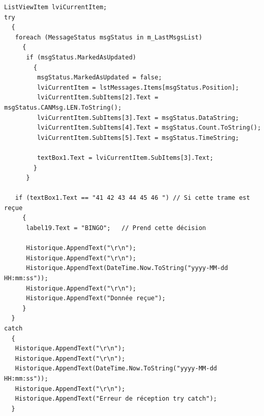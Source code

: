 \documentclass[10pt,a4paper,final]{article}
\begin{document}
\begin{lstlisting}
ListViewItem lviCurrentItem;
try
  {
   foreach (MessageStatus msgStatus in m_LastMsgsList)
     {
      if (msgStatus.MarkedAsUpdated)
        {
         msgStatus.MarkedAsUpdated = false;
         lviCurrentItem = lstMessages.Items[msgStatus.Position];
         lviCurrentItem.SubItems[2].Text = msgStatus.CANMsg.LEN.ToString();
         lviCurrentItem.SubItems[3].Text = msgStatus.DataString;
         lviCurrentItem.SubItems[4].Text = msgStatus.Count.ToString();
         lviCurrentItem.SubItems[5].Text = msgStatus.TimeString;

         textBox1.Text = lviCurrentItem.SubItems[3].Text;
        }
      }

   if (textBox1.Text == "41 42 43 44 45 46 ") // Si cette trame est reçue
     {
      label19.Text = "BINGO";   // Prend cette décision

      Historique.AppendText("\r\n");
      Historique.AppendText("\r\n");
      Historique.AppendText(DateTime.Now.ToString("yyyy-MM-dd HH:mm:ss"));
      Historique.AppendText("\r\n");
      Historique.AppendText("Donnée reçue"); 
     }
  }
catch
  {
   Historique.AppendText("\r\n");
   Historique.AppendText("\r\n");
   Historique.AppendText(DateTime.Now.ToString("yyyy-MM-dd HH:mm:ss"));
   Historique.AppendText("\r\n");
   Historique.AppendText("Erreur de réception try catch");
  }
\end{lstlisting}
\end{document}
